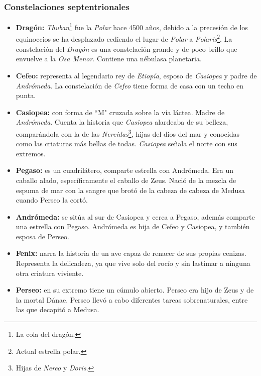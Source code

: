 \documentclass[10pt,a4paper]{article}
\begin{document}
\subsubsection{Constelaciones septentrionales}
\begin{itemize}
 \item \textbf{Dragón:} \textit{Thuban}\footnote{La cola del dragón.} fue la \textit{Polar} hace 4500 años, debido a la precesión de los equinoccios se ha desplazado cediendo el lugar de \textit{Polar} a \textit{Polaris}\footnote{Actual estrella polar.}. La constelación del \textit{Dragón} es una constelación grande y de poco brillo que envuelve a la \textit{Osa Menor}. Contiene una nébulasa planetaria.
 
 \item \textbf{Cefeo:} representa al legendario rey de \textit{Etiopía}, esposo de \textit{Casiopea} y padre de \textit{Andrómeda}. La constelación de \textit{Cefeo} tiene forma de casa con un techo en punta.

 \item \textbf{Casiopea:} con forma de ``M" cruzada sobre la vía láctea. Madre de \textit{Andrómeda}. Cuenta la historia que \textit{Casiopea} alardeaba de su belleza, comparándola con la de las \textit{Nereidas}\footnote{Hijas de \textit{Nereo} y \textit{Doris}.}, hijas del dios del mar y conocidas como las criaturas más bellas de todas. \textit{Casiopea} señala el norte con sus extremos.
 
 \item \textbf{Pegaso:} es un cuadrilátero, comparte estrella con Andrómeda. Era un caballo alado, específicamente el caballo de Zeus. Nació de la mezcla de espuma de mar con la sangre que brotó de la cabeza de cabeza de Medusa cuando Perseo la cortó.
 
 \item \textbf{Andrómeda:} se sitúa al sur de Casiopea y cerca a Pegaso, además comparte una estrella con Pegaso. Andrómeda es hija de Cefeo y Casiopea, y también esposa de Perseo.
 
 \item \textbf{Fenix:} narra la historia de un ave capaz de renacer de sus propias cenizas. Representa la delicadeza, ya que vive solo del rocío y sin lastimar a ninguna otra criatura viviente.
 
 \item \textbf{Perseo:} en su extremo tiene un cúmulo abierto. Perseo era hijo de Zeus y de la mortal Dánae. Perseo llevó a cabo diferentes tareas sobrenaturales, entre las que decapitó a Medusa.
 

\end{itemize}
\end{document}
